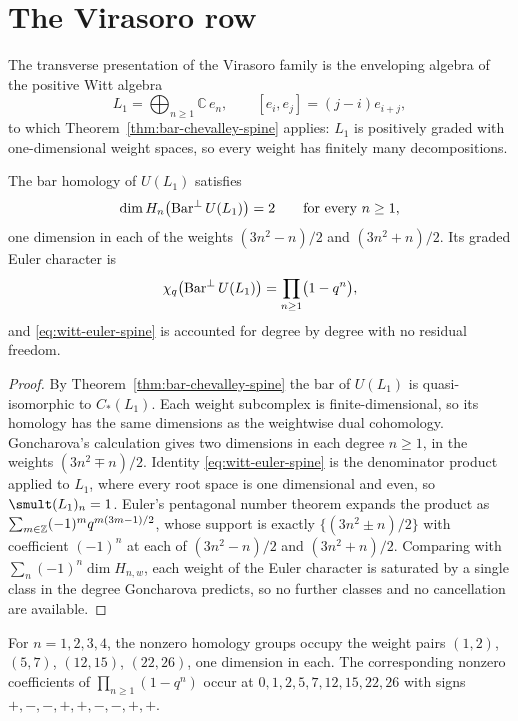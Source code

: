 \section{The Virasoro row}

The transverse presentation of the Virasoro family is the enveloping algebra of
the positive Witt algebra
\[
 L_1=\bigoplus_{n\ge1}\mathbb C\,e_n,
 \qquad
 [e_i,e_j]=(j-i)e_{i+j},
\]
to which Theorem~\ref{thm:bar-chevalley-spine} applies: $L_1$ is positively
graded with one-dimensional weight spaces, so every weight has finitely many
decompositions.

\begin{theorem}
\label{thm:pentagonal-spine}
The bar homology of $U(L_1)$ satisfies
\[
 \dim H_n\bigl(\operatorname{Bar}^{\perp} U(L_1)\bigr)=2
 \qquad\text{for every }n\ge1,
\]
one dimension in each of the weights $(3n^2-n)/2$ and $(3n^2+n)/2$. Its graded
Euler character is
\begin{equation}
\label{eq:witt-euler-spine}
 \chi_q\bigl(\operatorname{Bar}^{\perp} U(L_1)\bigr)=\prod_{n\ge1}\bigl(1-q^n\bigr),
\end{equation}
and \eqref{eq:witt-euler-spine} is accounted for degree by degree with no
residual freedom.
\end{theorem}
\begin{proof}
By Theorem~\ref{thm:bar-chevalley-spine} the bar of $U(L_1)$ is quasi-isomorphic to $C_*(L_1)$.
Each weight subcomplex is finite-dimensional, so its homology has the same
dimensions as the weightwise dual cohomology. Goncharova's calculation gives
two dimensions in each degree $n\ge1$, in the weights $(3n^2\mp n)/2$. Identity \eqref{eq:witt-euler-spine} is the
denominator product applied to $L_1$, where every root space is one dimensional
and even, so $\smult(L_1)_n=1$. Euler's pentagonal number theorem expands the
product as $\sum_{m\in\mathbb Z}(-1)^mq^{m(3m-1)/2}$, whose support is exactly
$\{(3n^2\pm n)/2\}$ with coefficient $(-1)^n$ at each of $(3n^2-n)/2$ and
$(3n^2+n)/2$. Comparing with $\sum_n(-1)^n\dim H_{n,w}$, each weight of the Euler
character is saturated by a single class in the degree Goncharova predicts, so
no further classes and no cancellation are available.
\end{proof}

For $n=1,2,3,4$, the nonzero homology groups occupy the weight pairs
$(1,2)$, $(5,7)$, $(12,15)$, $(22,26)$, one dimension in each.
The corresponding nonzero coefficients of $\prod_{n\ge1}(1-q^n)$ occur at
$0,1,2,5,7,12,15,22,26$ with signs $+,-,-,+,+,-,-,+,+$.

